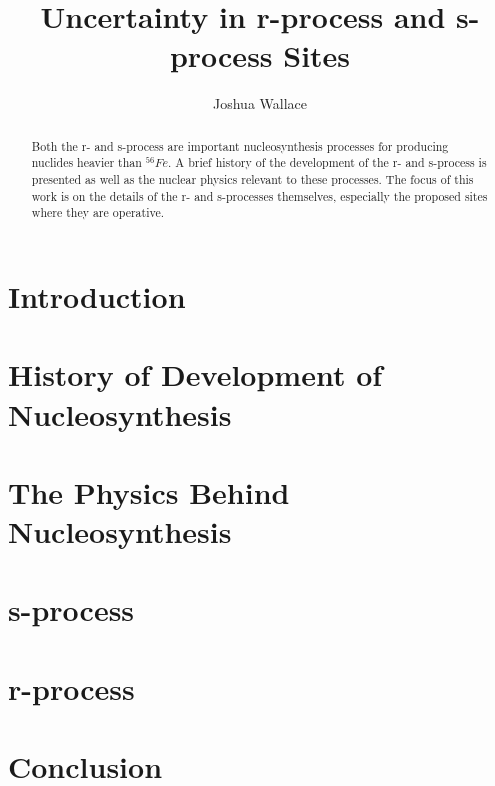 \documentclass{emulateapj}
\begin{document}
\title{Uncertainty in r-process and s-process Sites}

\author{Joshua Wallace}

\begin{abstract}
Both the r- and s-process are important nucleosynthesis processes for
producing nuclides heavier than $^{56}Fe$.  A brief history of the
development of the r- and s-process is presented as well as the
nuclear physics relevant to these processes.  The focus of this work
is on the details of the r- and s-processes themselves, especially the
proposed sites where they are operative.
\end{abstract}



\section{Introduction}


\section{History of Development of Nucleosynthesis}


\section{The Physics Behind Nucleosynthesis}


\section{s-process}



\section{r-process}



\section{Conclusion}




\end{document}
